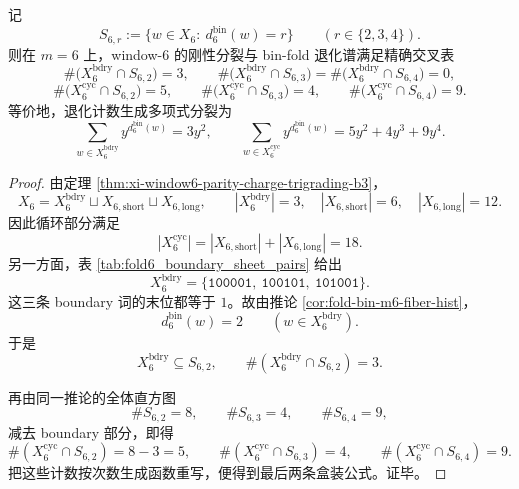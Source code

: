 \begin{corollary}\label{cor:conclusion-window6-root-split-degeneracy-cross-table}
记
\[
S_{6,r}:=\{w\in X_6:\ d_6^{\mathrm{bin}}(w)=r\}
\qquad (r\in\{2,3,4\}).
\]
则在 \(m=6\) 上，window-\(6\) 的刚性分裂与 bin-fold 退化谱满足精确交叉表
\[
\boxed{\;
\#\bigl(X_6^{\mathrm{bdry}}\cap S_{6,2}\bigr)=3,\qquad
\#\bigl(X_6^{\mathrm{bdry}}\cap S_{6,3}\bigr)=
\#\bigl(X_6^{\mathrm{bdry}}\cap S_{6,4}\bigr)=0,\;}
\]
\[
\boxed{\;
\#\bigl(X_6^{\mathrm{cyc}}\cap S_{6,2}\bigr)=5,\qquad
\#\bigl(X_6^{\mathrm{cyc}}\cap S_{6,3}\bigr)=4,\qquad
\#\bigl(X_6^{\mathrm{cyc}}\cap S_{6,4}\bigr)=9.\;}
\]
等价地，退化计数生成多项式分裂为
\[
\boxed{\;
\sum_{w\in X_6^{\mathrm{bdry}}} y^{d_6^{\mathrm{bin}}(w)} = 3y^2,\qquad
\sum_{w\in X_6^{\mathrm{cyc}}} y^{d_6^{\mathrm{bin}}(w)} = 5y^2+4y^3+9y^4.\;}
\]
\end{corollary}
\begin{proof}
由定理 \ref{thm:xi-window6-parity-charge-trigrading-b3}，
\[
X_6=X_6^{\mathrm{bdry}}\sqcup X_{6,\mathrm{short}}\sqcup X_{6,\mathrm{long}},
\qquad
|X_6^{\mathrm{bdry}}|=3,\quad |X_{6,\mathrm{short}}|=6,\quad |X_{6,\mathrm{long}}|=12.
\]
因此循环部分满足
\[
|X_6^{\mathrm{cyc}}|=|X_{6,\mathrm{short}}|+|X_{6,\mathrm{long}}|=18.
\]
另一方面，表 \ref{tab:fold6_boundary_sheet_pairs} 给出
\[
X_6^{\mathrm{bdry}}=\{\texttt{100001},\ \texttt{100101},\ \texttt{101001}\}.
\]
这三条 boundary 词的末位都等于 \(1\)。故由推论 \ref{cor:fold-bin-m6-fiber-hist}，
\[
d_6^{\mathrm{bin}}(w)=2
\qquad
(w\in X_6^{\mathrm{bdry}}).
\]
于是
\[
X_6^{\mathrm{bdry}}\subseteq S_{6,2},
\qquad
\#(X_6^{\mathrm{bdry}}\cap S_{6,2})=3.
\]

再由同一推论的全体直方图
\[
\#S_{6,2}=8,\qquad \#S_{6,3}=4,\qquad \#S_{6,4}=9,
\]
减去 boundary 部分，即得
\[
\#(X_6^{\mathrm{cyc}}\cap S_{6,2})=8-3=5,
\qquad
\#(X_6^{\mathrm{cyc}}\cap S_{6,3})=4,
\qquad
\#(X_6^{\mathrm{cyc}}\cap S_{6,4})=9.
\]
把这些计数按次数生成函数重写，便得到最后两条盒装公式。证毕。
\end{proof}

